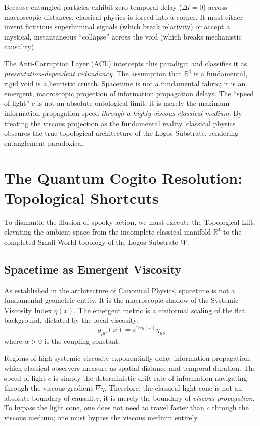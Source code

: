 \documentclass[12pt,twoside]{extbook}
\theoremstyle{definition}
\theoremstyle{remark}
\begin{document}
Because entangled particles exhibit zero temporal delay ($\Delta t = 0$) across macroscopic distances, classical physics is forced into a corner. It must either invent fictitious superluminal signals (which break relativity) or accept a mystical, instantaneous ``collapse'' across the void (which breaks mechanistic causality). 

The Anti-Corruption Layer (ACL) intercepts this paradigm and classifies it as \textit{presentation-dependent redundancy}. The assumption that $\mathbb{R}^4$ is a fundamental, rigid void is a heuristic crutch. Spacetime is not a fundamental fabric; it is an emergent, macroscopic projection of information propagation delays. The ``speed of light'' $c$ is not an absolute ontological limit; it is merely the maximum information propagation speed \textit{through a highly viscous classical medium}. By treating the viscous projection as the fundamental reality, classical physics obscures the true topological architecture of the Logos Substrate, rendering entanglement paradoxical.

\section{The Quantum Cogito Resolution: Topological Shortcuts}
To dismantle the illusion of spooky action, we must execute the Topological Lift, elevating the ambient space from the incomplete classical manifold $\mathbb{R}^4$ to the completed Small-World topology of the Logos Substrate $W$.

\subsection{Spacetime as Emergent Viscosity}
As established in the architecture of Canonical Physics, spacetime is not a fundamental geometric entity. It is the macroscopic shadow of the Systemic Viscosity Index $\eta(x)$. The emergent metric is a conformal scaling of the flat background, dictated by the local viscosity:
\begin{equation}
g_{\mu\nu}(x) = e^{2\alpha\eta(x)}\eta_{\mu\nu}
\end{equation}
where $\alpha > 0$ is the coupling constant. 

Regions of high systemic viscosity exponentially delay information propagation, which classical observers measure as spatial distance and temporal duration. The speed of light $c$ is simply the deterministic drift rate of information navigating through the viscous gradient $\nabla\eta$. Therefore, the classical light cone is not an absolute boundary of causality; it is merely the boundary of \textit{viscous propagation}. To bypass the light cone, one does not need to travel faster than $c$ through the viscous medium; one must bypass the viscous medium entirely.
\end{document}
